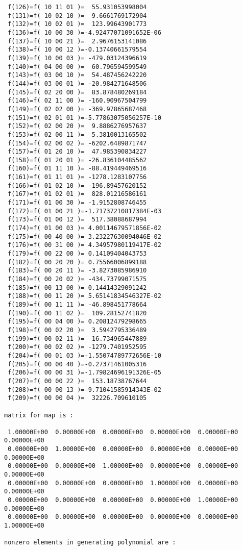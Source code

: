 \begin{footnotesize}
\begin{verbatim}
 f(126)=f( 10 11 01 )=  55.931053998004
 f(131)=f( 10 02 10 )=  9.6661769172904
 f(132)=f( 10 02 01 )=  123.99643901773
 f(136)=f( 10 00 30 )=-4.92477071091652E-06
 f(137)=f( 10 00 21 )=  2.9676153141086
 f(138)=f( 10 00 12 )=-0.13740661579554
 f(139)=f( 10 00 03 )= -479.03124396619
 f(140)=f( 04 00 00 )=  60.796594599549
 f(143)=f( 03 00 10 )=  54.487456242220
 f(144)=f( 03 00 01 )= -20.984271648506
 f(145)=f( 02 20 00 )=  83.878480269184
 f(146)=f( 02 11 00 )= -160.90967504799
 f(149)=f( 02 02 00 )= -369.97865687468
 f(151)=f( 02 01 01 )=-5.77863075056257E-10
 f(152)=f( 02 00 20 )=  9.8886276957637
 f(153)=f( 02 00 11 )=  5.3810013165502
 f(154)=f( 02 00 02 )= -6202.6489871747
 f(157)=f( 01 20 10 )=  47.985390834227
 f(158)=f( 01 20 01 )= -26.836104485562
 f(160)=f( 01 11 10 )= -88.419449469516
 f(161)=f( 01 11 01 )= -1278.1283107756
 f(166)=f( 01 02 10 )= -196.89457620152
 f(167)=f( 01 02 01 )=  828.01216586161
 f(171)=f( 01 00 30 )= -1.9152808746455
 f(172)=f( 01 00 21 )=-1.71737210817384E-03
 f(173)=f( 01 00 12 )=  517.38088687994
 f(174)=f( 01 00 03 )= 4.00114679571856E-02
 f(175)=f( 00 40 00 )= 3.23227630094046E-02
 f(176)=f( 00 31 00 )= 4.34957980119417E-02
 f(179)=f( 00 22 00 )= 0.14109404043753
 f(182)=f( 00 20 20 )= 0.75566006899188
 f(183)=f( 00 20 11 )= -3.8273085986910
 f(184)=f( 00 20 02 )= -434.73799071575
 f(185)=f( 00 13 00 )= 0.14414329091242
 f(188)=f( 00 11 20 )= 5.65141834546327E-02
 f(189)=f( 00 11 11 )= -46.898451778664
 f(190)=f( 00 11 02 )=  109.28152741820
 f(195)=f( 00 04 00 )= 0.20812479298665
 f(198)=f( 00 02 20 )=  3.5942795336489
 f(199)=f( 00 02 11 )=  16.734965447889
 f(200)=f( 00 02 02 )= -1279.7401952595
 f(204)=f( 00 01 03 )=-1.55074789772656E-10
 f(205)=f( 00 00 40 )=-0.27371461005316
 f(206)=f( 00 00 31 )=-1.79824696191326E-05
 f(207)=f( 00 00 22 )=  153.18738767644
 f(208)=f( 00 00 13 )=-9.71041585914343E-02
 f(209)=f( 00 00 04 )=  32226.709610105

matrix for map is :

 1.00000E+00  0.00000E+00  0.00000E+00  0.00000E+00  0.00000E+00 0.00000E+00
 0.00000E+00  1.00000E+00  0.00000E+00  0.00000E+00  0.00000E+00 0.00000E+00
 0.00000E+00  0.00000E+00  1.00000E+00  0.00000E+00  0.00000E+00 0.00000E+00
 0.00000E+00  0.00000E+00  0.00000E+00  1.00000E+00  0.00000E+00 0.00000E+00
 0.00000E+00  0.00000E+00  0.00000E+00  0.00000E+00  1.00000E+00 0.00000E+00
 0.00000E+00  0.00000E+00  0.00000E+00  0.00000E+00  0.00000E+00 1.00000E+00

nonzero elements in generating polynomial are :


\end{verbatim}
\end{footnotesize}
